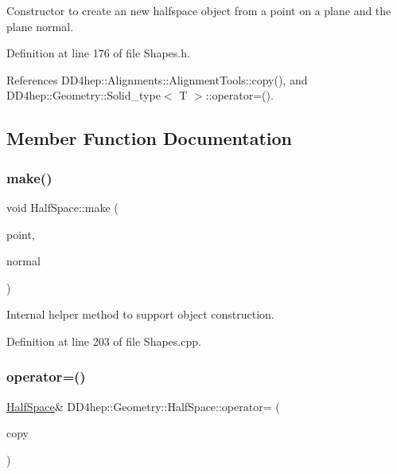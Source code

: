 Constructor to create an new halfspace object from a point on a plane and the plane normal. 



Definition at line 176 of file Shapes.\+h.



References D\+D4hep\+::\+Alignments\+::\+Alignment\+Tools\+::copy(), and D\+D4hep\+::\+Geometry\+::\+Solid\+\_\+type$<$ T $>$\+::operator=().



\subsection{Member Function Documentation}
\hypertarget{class_d_d4hep_1_1_geometry_1_1_half_space_abd2d6beb48210e1a9e29d6f16748b6dc}{}\label{class_d_d4hep_1_1_geometry_1_1_half_space_abd2d6beb48210e1a9e29d6f16748b6dc} 
\subsubsection{\texorpdfstring{make()}{make()}}
{\footnotesize\ttfamily void Half\+Space\+::make (\begin{DoxyParamCaption}\item[{const double $\ast$const}]{point,  }\item[{const double $\ast$const}]{normal }\end{DoxyParamCaption})\hspace{0.3cm}{\ttfamily [protected]}}



Internal helper method to support object construction. 



Definition at line 203 of file Shapes.\+cpp.

\hypertarget{class_d_d4hep_1_1_geometry_1_1_half_space_abe9415e34df5e9f75975dd51463d8a92}{}\label{class_d_d4hep_1_1_geometry_1_1_half_space_abe9415e34df5e9f75975dd51463d8a92} 
\subsubsection{\texorpdfstring{operator=()}{operator=()}}
{\footnotesize\ttfamily \hyperlink{class_d_d4hep_1_1_geometry_1_1_half_space}{Half\+Space}\& D\+D4hep\+::\+Geometry\+::\+Half\+Space\+::operator= (\begin{DoxyParamCaption}\item[{const \hyperlink{class_d_d4hep_1_1_geometry_1_1_half_space}{Half\+Space} \&}]{copy }\end{DoxyParamCaption})\hspace{0.3cm}{\ttfamily [default]}}



